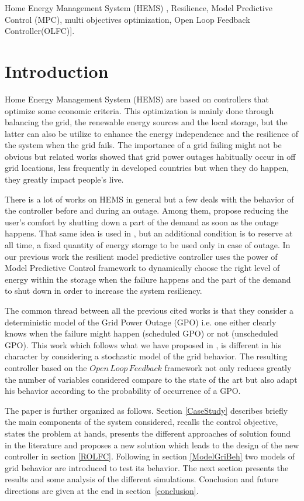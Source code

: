 \documentclass[conference]{IEEEtran}
\begin{document}
\begin{IEEEkeywords}
Home Energy Management System (HEMS) , Resilience, Model Predictive Control (MPC), multi objectives optimization, Open Loop Feedback Controller(OLFC)].
\end{IEEEkeywords}

\section{Introduction}
Home Energy Management System (HEMS) are based on controllers that optimize some economic criteria. This optimization is mainly done through balancing the grid, the renewable energy sources and the local storage, but the latter can also be utilize to enhance the energy independence and the resilience of the system when the grid fails. The importance of a grid failing might not be obvious but related works \cite{OnlnCER} showed that grid power outages habitually occur in off grid locations, less frequently in developed countries but when they do happen, they greatly impact people's live.

There is a lot of works on HEMS in general but a few deals with the behavior of the controller before and during an outage. Among them, \cite{HGhRBo2015,RRoFBe2014} propose reducing the user's comfort by shutting down a part of the demand as soon as the outage happens. That same idea is used in \cite{JMaHJa2016}, but an additional condition is to reserve at all time, a fixed quantity of energy storage to be used only in case of outage. In our previous work \cite{JPrPHa2019} the resilient model predictive controller uses the power of Model Predictive Control framework to dynamically choose the right level of energy within the storage when the failure happens and the part of the demand to shut down in order to increase the system resiliency.

The common thread between all the previous cited works is that they consider a deterministic model of the Grid Power Outage (GPO) i.e. one either clearly knows when the failure might happen (scheduled GPO) or not (unscheduled GPO). 
This work which follows what we have proposed in \cite{JPrPHa2019}, is different in his character by considering a stochastic model of the grid behavior. The resulting controller based on the $ Open\, Loop\, Feedback$ framework  not only reduces greatly the number of variables considered compare to the state of the art but also adapt his behavior according to the probability of occurrence of a GPO.

The paper is further organized as follows. Section \ref{CaseStudy} describes briefly the main components of the system considered, recalls the control objective, states the problem at hands, presents the different approaches of solution found in the literature and proposes a new solution which leads to the design of the new controller in section \ref{ROLFC}. Following in section \ref{ModelGriBeh} two models of grid behavior are introduced to test its behavior.  The next section presents the results and some analysis of the different simulations. Conclusion and future directions are given at the end in section~\ref{conclusion}.
\end{document}
